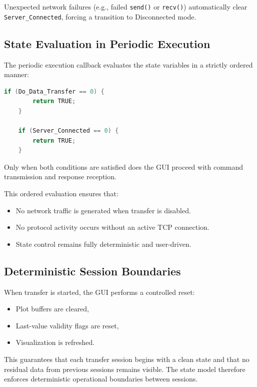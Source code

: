 Unexpected network failures (e.g., failed \texttt{send()} or \texttt{recv()}) automatically clear \texttt{Server\_Connected}, forcing a transition to Disconnected mode.

\subsection{State Evaluation in Periodic Execution}
\label{sec:gui_state_eval}

The periodic execution callback evaluates the state variables in a strictly ordered manner:

\begin{lstlisting}[language=C]
	if (Do_Data_Transfer == 0) {
		return TRUE;
	}
	
	if (Server_Connected == 0) {
		return TRUE;
	}
\end{lstlisting}

Only when both conditions are satisfied does the GUI proceed with command transmission and response reception.

This ordered evaluation ensures that:

\begin{itemize}
	\item No network traffic is generated when transfer is disabled.
	\item No protocol activity occurs without an active TCP connection.
	\item State control remains fully deterministic and user-driven.
\end{itemize}

\subsection{Deterministic Session Boundaries}
\label{sec:gui_session_boundaries}

When transfer is started, the GUI performs a controlled reset:

\begin{itemize}
	\item Plot buffers are cleared,
	\item Last-value validity flags are reset,
	\item Visualization is refreshed.
\end{itemize}

This guarantees that each transfer session begins with a clean state and that no residual data from previous sessions remains visible. The state model therefore enforces deterministic operational boundaries between sessions.

